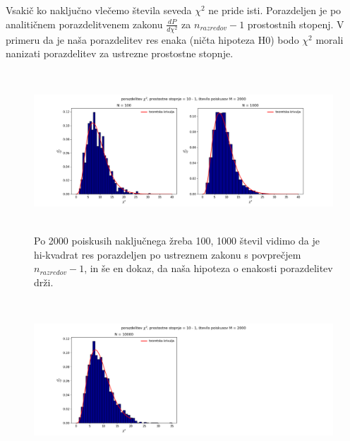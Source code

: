 \documentclass[11pt, a4paper]{article}
\begin{document}
Vsakič ko naključno vlečemo števila seveda $\chi^2$ ne pride isti. Porazdeljen je po analitičnem porazdelitvenem zakonu $\frac{dP}{d\chi^2}$ za $ n_{razredov} - 1 $ prostostnih stopenj. V primeru da je naša porazdelitev res enaka (ničta hipoteza H0) bodo $\chi^2$ morali nanizati porazdelitev za ustrezne prostostne stopnje.
\begin{figure}[H]
\hspace*{-2.5cm}  
  \includegraphics[width=22cm, height=6cm]{hi_statistika_1.png}
 \caption{Po 2000 poiskusih naključnega žreba 100, 1000 števil vidimo da je hi-kvadrat res porazdeljen po ustreznem zakonu s povprečjem $n_{razredov}-1$, in še en dokaz, da naša hipoteza o enakosti porazdelitev drži. }
\end{figure}
\begin{figure}[H]
\hspace*{-2.5cm}  
  \includegraphics[width=22cm, height =6cm]{hi_statistika_2.png}
 \caption{}
\end{figure}
\end{document}
